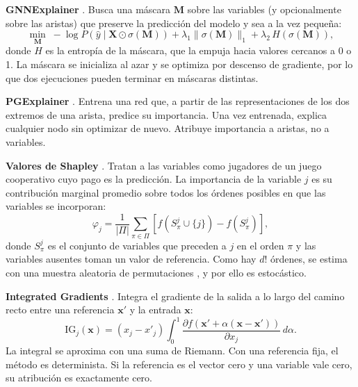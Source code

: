 \textbf{GNNExplainer} \cite{Ying2019GNNExplainer}. Busca una máscara $\mathbf{M}$ sobre las
variables (y opcionalmente sobre las aristas) que preserve la predicción del modelo y sea a la
vez pequeña:
\begin{equation}
  \min_{\mathbf{M}} \; -\log P\!\left(\hat{y} \mid \mathbf{X} \odot \sigma(\mathbf{M})\right)
  + \lambda_1 \lVert \sigma(\mathbf{M}) \rVert_1 + \lambda_2 \, H\!\left(\sigma(\mathbf{M})\right),
\end{equation}
donde $H$ es la entropía de la máscara, que la empuja hacia valores cercanos a 0 o 1. La
máscara se inicializa al azar y se optimiza por descenso de gradiente, por lo que dos
ejecuciones pueden terminar en máscaras distintas.

\textbf{PGExplainer} \cite{Luo2020PGExplainer}. Entrena una red que, a partir de las
representaciones de los dos extremos de una arista, predice su importancia. Una vez entrenada,
explica cualquier nodo sin optimizar de nuevo. Atribuye importancia a aristas, no a variables.

\textbf{Valores de Shapley} \cite{Lundberg2017SHAP, Strumbelj2014Explaining}. Tratan a las
variables como jugadores de un juego cooperativo cuyo pago es la predicción. La importancia de
la variable $j$ es su contribución marginal promedio sobre todos los órdenes posibles en que
las variables se incorporan:
\begin{equation}
  \varphi_j = \frac{1}{|\Pi|}\sum_{\pi \in \Pi} \left[f\!\left(S_{\pi}^{j} \cup \{j\}\right)
  - f\!\left(S_{\pi}^{j}\right)\right],
\end{equation}
donde $S_{\pi}^{j}$ es el conjunto de variables que preceden a $j$ en el orden $\pi$ y las
variables ausentes toman un valor de referencia. Como hay $d!$ órdenes, se estima con una
muestra aleatoria de permutaciones \cite{Castro2009Polynomial}, y por ello es estocástico.

\textbf{Integrated Gradients} \cite{Sundararajan2017IG}. Integra el gradiente de la salida a lo
largo del camino recto entre una referencia $\mathbf{x}'$ y la entrada $\mathbf{x}$:
\begin{equation}
  \mathrm{IG}_j(\mathbf{x}) = (x_j - x'_j) \int_0^1 \frac{\partial f\!\left(\mathbf{x}' +
  \alpha(\mathbf{x} - \mathbf{x}')\right)}{\partial x_j}\, d\alpha.
\end{equation}
La integral se aproxima con una suma de Riemann. Con una referencia fija, el método es
determinista. Si la referencia es el vector cero y una variable vale cero, su atribución es
exactamente cero.

